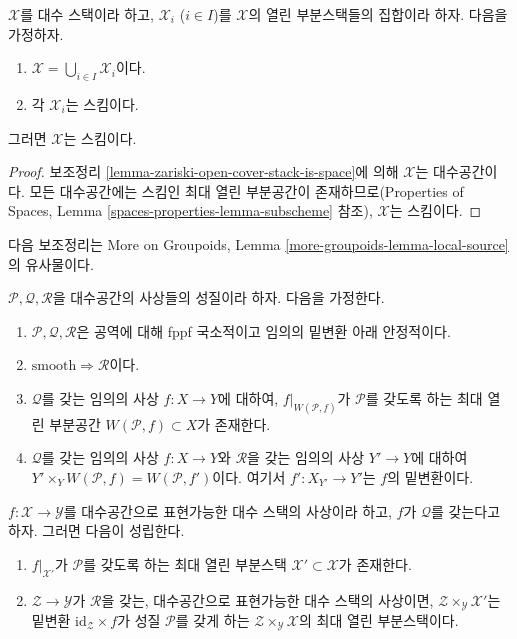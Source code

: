 \begin{lemma}
\label{lemma-zariski-open-cover-stack-is-scheme}
$\mathcal X$를 대수 스택이라 하고, $\mathcal{X}_i$ ($i \in I$)를
$\mathcal{X}$의 열린 부분스택들의 집합이라 하자. 다음을 가정하자.
\begin{enumerate}
\item $\mathcal{X} = \bigcup_{i \in I} \mathcal{X}_i$이다.
\item 각 $\mathcal{X}_i$는 스킴이다.
\end{enumerate}
그러면 $\mathcal{X}$는 스킴이다.
\end{lemma}

\begin{proof}
보조정리 \ref{lemma-zariski-open-cover-stack-is-space}에 의해
$\mathcal{X}$는 대수공간이다. 모든 대수공간에는 스킴인 최대 열린 부분공간이
존재하므로(Properties of Spaces,
Lemma \ref{spaces-properties-lemma-subscheme} 참조),
$\mathcal{X}$는 스킴이다.
\end{proof}


\noindent
다음 보조정리는 More on Groupoids,
Lemma \ref{more-groupoids-lemma-local-source}의 유사물이다.

\begin{lemma}
\label{lemma-local-source}
$\mathcal{P}, \mathcal{Q}, \mathcal{R}$을 대수공간의 사상들의 성질이라 하자.
다음을 가정한다.
\begin{enumerate}
\item $\mathcal{P}, \mathcal{Q}, \mathcal{R}$은 공역에 대해 fppf 국소적이고
임의의 밑변환 아래 안정적이다.
\item $\text{smooth} \Rightarrow \mathcal{R}$이다.
\item $\mathcal{Q}$를 갖는 임의의 사상 $f : X \to Y$에 대하여,
$f|_{W(\mathcal{P}, f)}$가 $\mathcal{P}$를 갖도록 하는 최대 열린 부분공간
$W(\mathcal{P}, f) \subset X$가 존재한다.
\item $\mathcal{Q}$를 갖는 임의의 사상 $f : X \to Y$와
$\mathcal{R}$을 갖는 임의의 사상 $Y' \to Y$에 대하여
$Y' \times_Y W(\mathcal{P}, f) = W(\mathcal{P}, f')$이다. 여기서
$f' : X_{Y'} \to Y'$는 $f$의 밑변환이다.
\end{enumerate}
$f : \mathcal{X} \to \mathcal{Y}$를 대수공간으로 표현가능한 대수 스택의
사상이라 하고, $f$가 $\mathcal{Q}$를 갖는다고 하자. 그러면 다음이 성립한다.
\begin{enumerate}
\item[(A)] $f|_{\mathcal{X}'}$가 $\mathcal{P}$를 갖도록 하는 최대 열린
부분스택 $\mathcal{X}' \subset \mathcal{X}$가 존재한다.
\item[(B)] $\mathcal{Z} \to \mathcal{Y}$가 $\mathcal{R}$을 갖는,
대수공간으로 표현가능한 대수 스택의 사상이면,
$\mathcal{Z} \times_\mathcal{Y} \mathcal{X}'$는 밑변환
$\text{id}_\mathcal{Z} \times f$가 성질 $\mathcal{P}$를 갖게 하는
$\mathcal{Z} \times_\mathcal{Y} \mathcal{X}$의 최대 열린 부분스택이다.
\end{enumerate}
\end{lemma}

